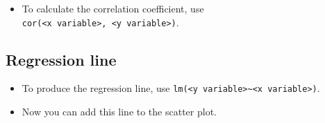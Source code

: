 \documentclass[]{article}
\newenvironment{Shaded}{\begin{snugshade}}{\end{snugshade}}
\newcommand{\CommentTok}[1]{\textcolor[rgb]{0.56,0.35,0.01}{\textit{#1}}}
\newcommand{\DataTypeTok}[1]{\textcolor[rgb]{0.13,0.29,0.53}{#1}}
\newcommand{\KeywordTok}[1]{\textcolor[rgb]{0.13,0.29,0.53}{\textbf{#1}}}
\newcommand{\NormalTok}[1]{#1}
\newcommand{\OperatorTok}[1]{\textcolor[rgb]{0.81,0.36,0.00}{\textbf{#1}}}
\providecommand{\tightlist}{%
  \setlength{\itemsep}{0pt}\setlength{\parskip}{0pt}}
\begin{document}
\begin{itemize}
\tightlist
\item
  To calculate the correlation coefficient, use \texttt{cor(\textless{}x\ variable\textgreater{},\ \textless{}y\ variable\textgreater{})}.
\end{itemize}

\begin{Shaded}
\end{Shaded}

\hypertarget{regression-line}{%
\subsection{Regression line}\label{regression-line}}

\begin{itemize}
\tightlist
\item
  To produce the regression line, use \texttt{lm(\textless{}y\ variable\textgreater{}\textasciitilde{}\textless{}x\ variable\textgreater{})}.
\end{itemize}

\begin{Shaded}
\end{Shaded}

\begin{itemize}
\tightlist
\item
  Now you can add this line to the scatter plot.
\end{itemize}

\begin{Shaded}
\end{Shaded}
\end{document}
